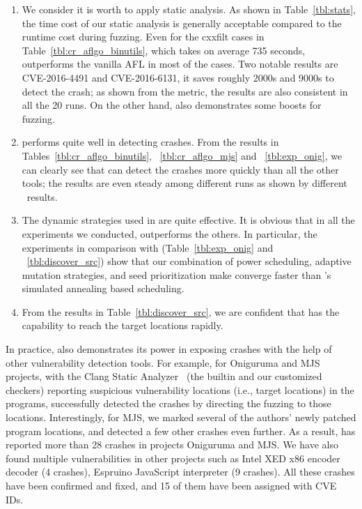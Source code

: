 \begin{enumerate}[\textbf{RQ}1]
    \item  We consider it is worth to apply static analysis. As shown in Table~\ref{tbl:stats}, the time cost of our static analysis is generally acceptable compared to the runtime cost during fuzzing. Even for the cxxfilt cases in Table~\ref{tbl:cr_aflgo_binutils}, which takes on average 735 seconds, \dFOT outperforms the vanilla AFL in most of the cases. Two notable results are CVE-2016-4491 and CVE-2016-6131, it saves roughly 2000s and 9000s to detect the crash; as shown from the {\alz} metric, the results are also consistent in all the 20 runs. On the other hand, \dFOT also demonstrates some boosts for fuzzing.
    \item  \dFOT performs quite well in detecting crashes. From the results in Tables~\ref{tbl:cr_aflgo_binutils}, ~\ref{tbl:cr_aflgo_mjs} and ~\ref{tbl:exp_onig}, we can clearly see that \dFOT can detect the crashes more quickly than all the other tools; the results are even steady among different runs as shown by different {\alz}~results.
    \item  The dynamic strategies used in \dFOT are quite effective. It is obvious that in all the experiments we conducted, \dFOT outperforms the others. In particular, the  experiments in comparison with \dGO (Table~\ref{tbl:exp_onig} and ~\ref{tbl:discover_src}) show that our combination of power scheduling, adaptive mutation strategies, and seed prioritization make \dFOT converge faster than \aflgo's simulated annealing based scheduling.
    \item  From the results in Table~\ref{tbl:discover_src}, we are confident that \dFOT has the capability to reach the target locations rapidly.
\end{enumerate}

In practice, \dFOT also demonstrates its power in exposing crashes with the help of other vulnerability detection tools. For example, for Oniguruma and MJS projects, with the Clang Static Analyzer~\cite{csa} (the builtin and our customized checkers) reporting suspicious vulnerability locations (i.e., target locations) in the programs, \dFOT successfully detected the crashes by directing the fuzzing to those locations. Interestingly, for MJS, we marked several of the authors' newly patched program locations, and detected a few other crashes even further. As a result, \dFOT has reported more than 28 crashes in projects Oniguruma and MJS. We have also found multiple vulnerabilities in other projects such as Intel XED x86 encoder decoder (4 crashes), Espruino JavaScript interpreter (9 crashes).  All these crashes have been confirmed and fixed, and 15 of them have been assigned with CVE IDs. 

